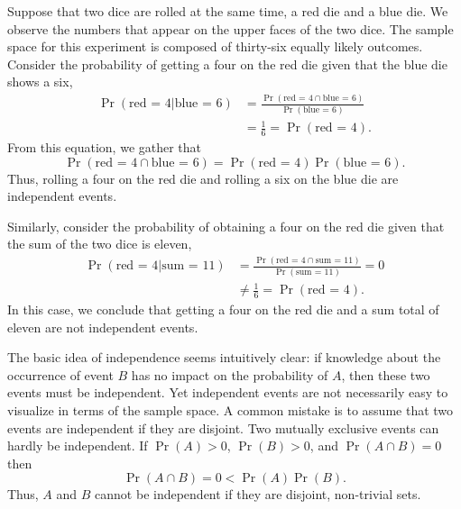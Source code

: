 \begin{example}
Suppose that two dice are rolled at the same time, a red die and a blue die.
We observe the numbers that appear on the upper faces of the two dice.
The sample space for this experiment is composed of thirty-six equally likely outcomes.
Consider the probability of getting a four on the red die given that the blue die shows a six,
\begin{equation*}
\begin{split}
\Pr (\text{red = 4} | \text{blue = 6})
&= \frac{ \Pr (\text{red = 4} \cap \text{blue = 6}) }
{ \Pr (\text{blue = 6}) } \\
&= \frac{1}{6} = \Pr (\text{red = 4}) .
\end{split}
\end{equation*}
From this equation, we gather that
\begin{equation*}
\Pr (\text{red = 4} \cap \text{blue = 6})
= \Pr (\text{red = 4}) \Pr (\text{blue = 6}) .
\end{equation*}
Thus, rolling a four on the red die and rolling a six on the blue die are independent events.

Similarly, consider the probability of obtaining a four on the red die given that the sum of the two dice is eleven,
\begin{equation*}
\begin{split}
\Pr (\text{red = 4} | \text{sum = 11})
&= \frac{ \Pr (\text{red = 4} \cap \text{sum = 11}) }
{ \Pr (\text{sum = 11}) } = 0 \\
&\neq \frac{1}{6} = \Pr (\text{red = 4}) .
\end{split}
\end{equation*}
In this case, we conclude that getting a four on the red die and a sum total of eleven are not independent events.
\end{example}

The basic idea of independence seems intuitively clear: if knowledge about the occurrence of event $B$ has no impact on the probability of $A$, then these two events must be independent.
Yet independent events are not necessarily easy to visualize in terms of the sample space.
A common mistake is to assume that two events are independent if they are disjoint.
Two mutually exclusive events can hardly be independent.
If $\Pr (A) > 0$, $\Pr (B) > 0$, and $\Pr (A \cap B) = 0$ then
\begin{equation*}
\Pr (A \cap B) = 0 < \Pr (A) \Pr(B).
\end{equation*}
Thus, $A$ and $B$ cannot be independent if they are disjoint, non-trivial sets.


